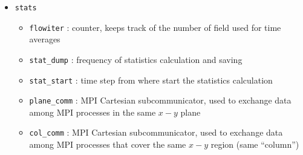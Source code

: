 \begin{itemize}
\begin{itemize}
\end{itemize}
\item \texttt{stats}
\begin{itemize}
\item \texttt{flowiter} : counter, keeps track of the number of field used for time averages
\item \texttt{stat\_dump} : frequency of statistics calculation and saving
\item \texttt{stat\_start} : time step from where start the statistics calculation
\item \texttt{plane\_comm} : MPI Cartesian subcommunicator, used to exchange data among MPI processes in the same $x-y$ plane
\item \texttt{col\_comm} : MPI Cartesian subcommunicator, used to exchange data among MPI processes that cover the same $x-y$ region (same ``column'')
\end{itemize}
\end{itemize}


